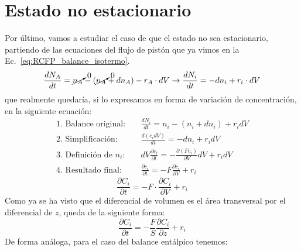 \section{Estado no estacionario}
\noindent Por último, vamos a estudiar el caso de que el estado no sea estacionario, partiendo de las ecuaciones del flujo de pistón que ya vimos en la Ec.~\eqref{eq:RCFP_balance_isotermo}.
\begin{equation}
    \frac{dN_A}{dt} = \cancelto{0}{n_A} - (\cancelto{0}{n_A} + dn_A) - r_A\cdot dV \rightarrow \frac{dN_i}{dt} = -dn_i + r_i \cdot dV
\end{equation}
que realmente quedaría, si lo expresamos en forma de variación de concentración, en la siguiente ecuación:
\begin{equation*}
    \begin{aligned}
        \text{1. Balance original:} \quad   & \frac{dN_i}{dt} = n_i - (n_i + dn_i) + r_i dV                                         \\
        \text{2. Simplificación:} \quad     & \frac{d(c_i dV)}{dt} = -dn_i + r_i dV                                                 \\
        \text{3. Definición de } n_i: \quad & dV \frac{\partial c_i}{\partial t} = -\frac{\partial (F c_i)}{\partial V} dV + r_i dV \\
        \text{4. Resultado final:} \quad    & \frac{\partial c_i}{\partial t} = -F \frac{\partial c_i}{\partial V} + r_i
    \end{aligned}
\end{equation*}
\begin{equation}
    \frac{\partial C_i}{\partial t} = -F\cdot \frac{\partial C_i}{\partial V} +r_i
\end{equation}
\noindent Como ya se ha visto que el diferencial de volumen es el área transversal por el diferencial de $z$, queda de la siguiente forma:
\begin{equation}
    \frac{\partial C_i}{\partial t} = -\frac{F}{S}\frac{\partial C_i}{\partial z} +r_i
\end{equation}
De forma análoga, para el caso del balance entálpico tenemos:
